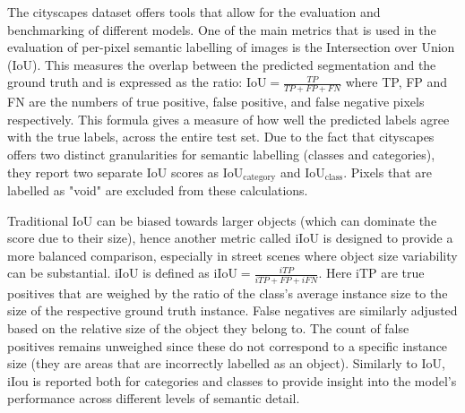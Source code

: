 The cityscapes dataset offers tools that allow for the evaluation and benchmarking of different models. One of the main metrics that is used in the evaluation of per-pixel semantic labelling of images is the Intersection over Union (IoU). This measures the overlap between the predicted segmentation and the ground truth and is expressed as the ratio: $\text{IoU} = \frac{TP}{TP + FP + FN}$ where TP, FP and FN are the numbers of true positive, false positive, and false negative pixels respectively. This formula gives a measure of how well the predicted labels agree with the true labels, across the entire test set. Due to the fact that cityscapes offers two distinct granularities for semantic labelling (classes and categories), they report two separate IoU scores as IoU$_\text{category}$ and IoU$_\text{class}$. Pixels that are labelled as "void" are excluded from these calculations. 

Traditional IoU can be biased towards larger objects (which can dominate the score due to their size), hence another metric called iIoU is designed to provide a more balanced comparison, especially in street scenes where object size variability can be substantial. iIoU is defined as $\text{iIoU} = \frac{iTP}{iTP + FP + iFN}$. Here iTP are true positives that are weighed by the ratio of the class's average instance size to the size of the respective ground truth instance. False negatives are similarly adjusted based on the relative size of the object they belong to. The count of false positives remains unweighed since these do not correspond to a specific instance size (they are areas that are incorrectly labelled as an object). Similarly to IoU, iIou is reported both for categories and classes to provide insight into the model's performance across different levels of semantic detail.